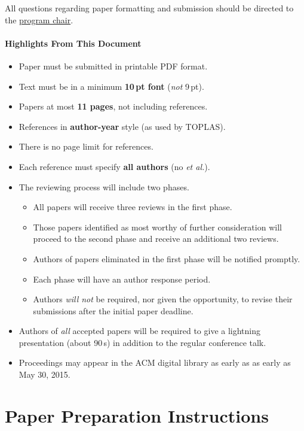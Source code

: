 \documentclass[pldi]{sigplanconf}
\begin{document}
All questions regarding paper formatting and submission should be
directed to the
\href{mailto:steve.blackburn@anu.edu.au?subject=[PLDI'15]}{program
  chair}.

\paragraph{Highlights From This Document}
\begin{itemize}[noitemsep]
\item Paper must be submitted in printable PDF format.
\item Text must be in a minimum \textbf{10\,pt font} (\emph{not} 9\,pt).
\item Papers at most \textbf{11 pages}, not including references. 
\item References in \textbf{author-year} style (as used by TOPLAS).
\item There is no page limit for references. 
\item Each reference must specify \textbf{all authors} (no \emph{et al.}). 
\item The reviewing process will include two phases.
  \begin{itemize}
  \item All papers will receive three reviews in the first phase.
  \item Those papers identified as most worthy of further consideration will proceed to the second phase and receive an additional two reviews.
  \item Authors of papers eliminated in the first phase will be notified promptly.
  \item Each phase will have an author response period.
  \item Authors \emph{will not} be required, nor given the opportunity, to revise their submissions after the initial paper deadline.
  \end{itemize}
\item Authors of \emph{all} accepted papers will be required to give a
  lightning presentation (about 90\,s) in addition to
  the regular conference talk.
\item Proceedings may appear in the ACM digital library as early as as early as May 30, 2015.
\end{itemize} 



\section{Paper Preparation Instructions}
\end{document}
